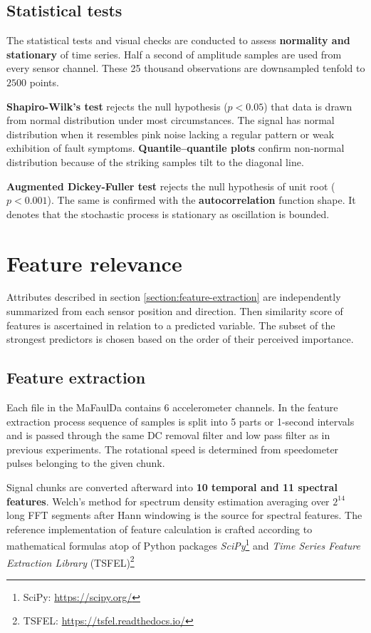 \subsection{Statistical tests}
The statistical tests and visual checks are conducted to assess \textbf{normality and stationary} of time series. Half a second of amplitude samples are used from every sensor channel. These 25 thousand observations are downsampled tenfold to $2500$ points. 

\textbf{Shapiro-Wilk's test} rejects the null hypothesis (${p < 0.05}$) that data is drawn from normal distribution under most circumstances. The signal has normal distribution when it resembles pink noise lacking a regular pattern or weak exhibition of fault symptoms. \textbf{Quantile–quantile plots} confirm non-normal distribution because of the striking samples tilt to the diagonal line.

\textbf{Augmented Dickey-Fuller test} rejects the null hypothesis of unit root 
(${p < 0.001}$). The same is confirmed with the \textbf{autocorrelation} function shape. It denotes that the stochastic process is stationary as oscillation is bounded.

\section{Feature relevance}
Attributes described in section \ref{section:feature-extraction} are independently summarized from each sensor position and direction. Then similarity score of features is ascertained in relation to a predicted variable. The subset of the strongest predictors is chosen based on the order of their perceived importance.

\subsection{Feature extraction}
Each file in the MaFaulDa contains 6 accelerometer channels. In the feature extraction process sequence of samples is split into 5 parts or 1-second intervals and is passed through the same DC removal filter and low pass filter as in previous experiments. The rotational speed is determined from speedometer pulses belonging to the given chunk. 

Signal chunks are converted afterward into \textbf{10 temporal and 11 spectral features}. Welch's method for spectrum density estimation averaging over $2^{14}$ long FFT segments after Hann windowing is the source for spectral features. The reference implementation of feature calculation is crafted according to mathematical formulas atop of Python packages \emph{SciPy}\footnote{SciPy: \url{https://scipy.org/}} and \emph{Time Series Feature Extraction Library} (TSFEL)\footnote{TSFEL: \url{https://tsfel.readthedocs.io/}}  

